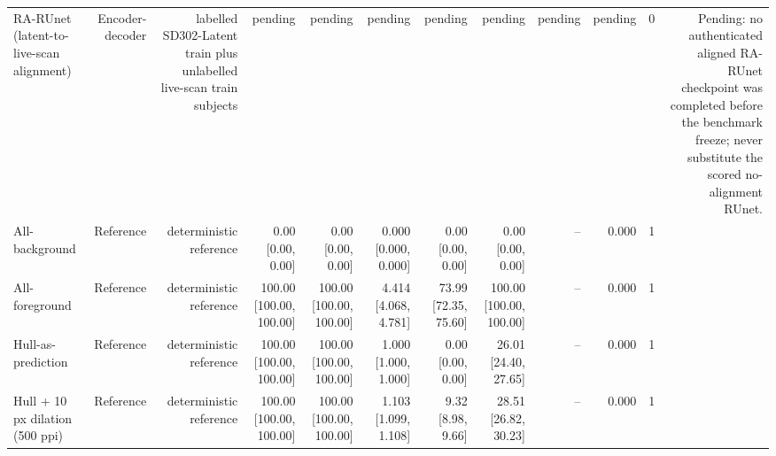 \begin{table}[t]
\begin{tabular}{lrrrrrrrrrrr}
RA-RUnet (latent-to-live-scan alignment) & Encoder-decoder & labelled SD302-Latent train plus unlabelled live-scan train subjects & pending & pending & pending & pending & pending & pending & pending & 0 & Pending: no authenticated aligned RA-RUnet checkpoint was completed before the benchmark freeze; never substitute the scored no-alignment RUnet. \\
All-background & Reference & deterministic reference & 0.00 [0.00, 0.00] & 0.00 [0.00, 0.00] & 0.000 [0.000, 0.000] & 0.00 [0.00, 0.00] & 0.00 [0.00, 0.00] & -- & 0.000 & 1 &  \\
All-foreground & Reference & deterministic reference & 100.00 [100.00, 100.00] & 100.00 [100.00, 100.00] & 4.414 [4.068, 4.781] & 73.99 [72.35, 75.60] & 100.00 [100.00, 100.00] & -- & 0.000 & 1 &  \\
Hull-as-prediction & Reference & deterministic reference & 100.00 [100.00, 100.00] & 100.00 [100.00, 100.00] & 1.000 [1.000, 1.000] & 0.00 [0.00, 0.00] & 26.01 [24.40, 27.65] & -- & 0.000 & 1 &  \\
Hull + 10 px dilation (500 ppi) & Reference & deterministic reference & 100.00 [100.00, 100.00] & 100.00 [100.00, 100.00] & 1.103 [1.099, 1.108] & 9.32 [8.98, 9.66] & 28.51 [26.82, 30.23] & -- & 0.000 & 1 &  \\
\bottomrule
\end{tabular}
\end{table}

